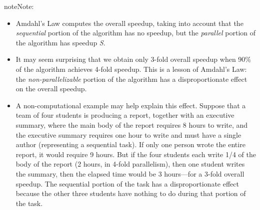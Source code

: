 \documentclass[letterpaper,10pt,english]{sphinxmanual}
\begin{document}
\begin{notice}{note}{Note:}\begin{itemize}
\item {} 
Amdahl's Law computes the overall speedup, taking into account that the \emph{sequential} portion of the algorithm has no speedup, but the \emph{parallel} portion of the algorithm has speedup \emph{S}.

\item {} 
It may seem surprising that we obtain only 3-fold overall speedup when 90\% of the algorithm achieves 4-fold speedup. This is a lesson of Amdahl's Law: the \emph{non-parallelizable} portion of the algorithm has a disproportionate effect on the overall speedup.

\item {} 
A non-computational example may help explain this effect. Suppose that a team of four students is producing a report, together with an executive summary, where the main body of the report requires 8 hours to write, and the executive summary requires one hour to write and must have a single author (representing a sequential task). If only one person wrote the entire report, it would require 9 hours. But if the four students each write 1/4 of the body of the report (2 hours, in 4-fold parallelism), then one student writes the summary, then the elapsed time would be 3 hours---for a 3-fold overall speedup. The sequential portion of the task has a disproportionate effect because the other three students have nothing to do during that portion of the task.

\end{itemize}
\end{notice}
\end{document}
